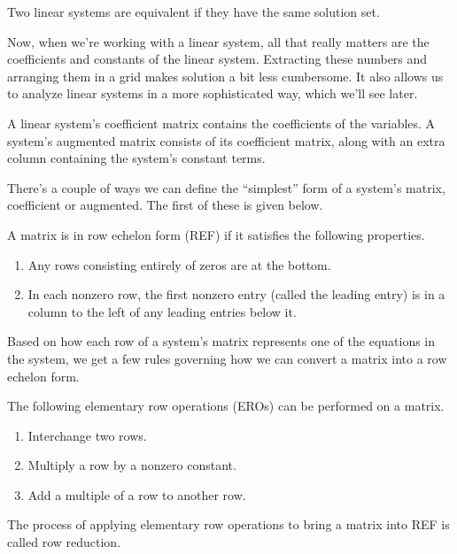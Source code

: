 \documentclass[../m73main.tex]{subfiles}
\begin{document}
\begin{definition}
	Two linear systems are equivalent if they have the same solution set.
\end{definition}

Now, when we're working with a linear system, all that really matters are the coefficients and constants of the linear system.
Extracting these numbers and arranging them in a grid makes solution a bit less cumbersome.
It also allows us to analyze linear systems in a more sophisticated way, which we'll see later.

\begin{definition}
	A linear system's coefficient matrix contains the coefficients of the variables.
	A system's augmented matrix consists of its coefficient matrix, along with an extra column containing the system's constant terms.
\end{definition}

There's a couple of ways we can define the ``simplest'' form of a system's matrix, coefficient or augmented.
The first of these is given below.

\begin{definition}
	A matrix is in row echelon form (REF) if it satisfies the following properties.
	\begin{enumerate}
		\item Any rows consisting entirely of zeros are at the bottom.
		\item In each nonzero row, the first nonzero entry (called the leading entry) is in a column to the left of any leading entries below it.
	\end{enumerate}
\end{definition}

Based on how each row of a system's matrix represents one of the equations in the system, we get a few rules governing how we can convert a matrix into a row echelon form.

\begin{definition}
	The following elementary row operations (EROs) can be performed on a matrix.
	\begin{enumerate}
		\item Interchange two rows.
		\item Multiply a row by a nonzero constant.
		\item Add a multiple of a row to another row.
	\end{enumerate}
	The process of applying elementary row operations to bring a matrix into REF is called row reduction.
\end{definition}
\end{document}
